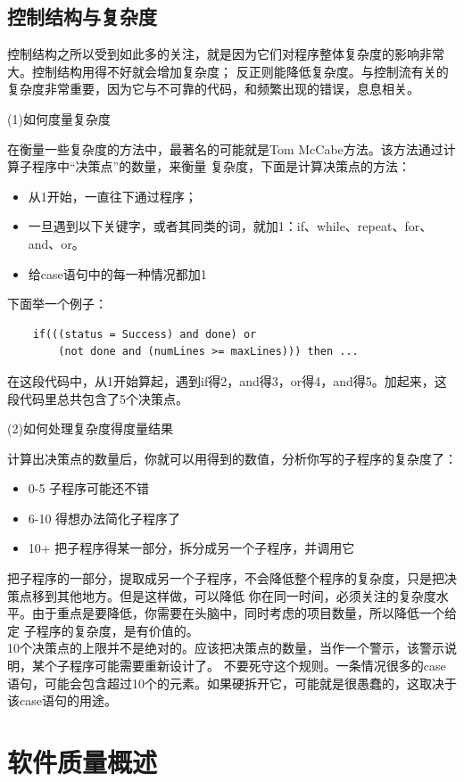 \documentclass{article}
\begin{document}
\subsection{控制结构与复杂度}
控制结构之所以受到如此多的关注，就是因为它们对程序整体复杂度的影响非常大。控制结构用得不好就会增加复杂度；
反正则能降低复杂度。与控制流有关的复杂度非常重要，因为它与不可靠的代码，和频繁出现的错误，息息相关。
\par
(1)如何度量复杂度
\par
在衡量一些复杂度的方法中，最著名的可能就是Tom McCabe方法。该方法通过计算子程序中“决策点”的数量，来衡量
复杂度，下面是计算决策点的方法：
\begin{itemize}
    \item 从1开始，一直往下通过程序；
    \item 一旦遇到以下关键字，或者其同类的词，就加1：if、while、repeat、for、and、or。
    \item 给case语句中的每一种情况都加1
\end{itemize}
下面举一个例子：
\begin{lstlisting}
    if(((status = Success) and done) or
        (not done and (numLines >= maxLines))) then ...
\end{lstlisting}
在这段代码中，从1开始算起，遇到if得2，and得3，or得4，and得5。加起来，这段代码里总共包含了5个决策点。

\par
(2)如何处理复杂度得度量结果
\par
计算出决策点的数量后，你就可以用得到的数值，分析你写的子程序的复杂度了：
\begin{itemize}
    \item 0-5  子程序可能还不错
    \item 6-10  得想办法简化子程序了
    \item 10+  把子程序得某一部分，拆分成另一个子程序，并调用它
\end{itemize}
把子程序的一部分，提取成另一个子程序，不会降低整个程序的复杂度，只是把决策点移到其他地方。但是这样做，可以降低
你在同一时间，必须关注的复杂度水平。由于重点是要降低，你需要在头脑中，同时考虑的项目数量，所以降低一个给定
子程序的复杂度，是有价值的。\\
10个决策点的上限并不是绝对的。应该把决策点的数量，当作一个警示，该警示说明，某个子程序可能需要重新设计了。
不要死守这个规则。一条情况很多的case语句，可能会包含超过10个的元素。如果硬拆开它，可能就是很愚蠢的，这取决于
该case语句的用途。



\section{软件质量概述}
\end{document}
